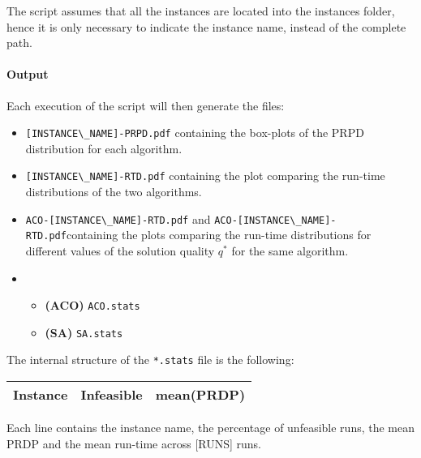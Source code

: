 \documentclass{article}
\begin{document}
The script assumes that all the instances are located into the instances folder, hence it is only necessary to indicate the instance name, instead of the complete path.

\paragraph{Output}

Each execution of the script will then generate the files:
\begin{itemize}
  \item \verb|[INSTANCE\_NAME]-PRPD.pdf| containing the box-plots of the PRPD distribution for each algorithm.
  \item \verb|[INSTANCE\_NAME]-RTD.pdf| containing the plot comparing the run-time distributions of the two algorithms.
  \item \verb|ACO-[INSTANCE\_NAME]-RTD.pdf| and \verb|ACO-[INSTANCE\_NAME]-RTD.pdf|containing the plots comparing the run-time distributions for different values of the solution quality $q^*$ for the same algorithm.
  \item 
        \begin{itemize}
          \item \textbf{(ACO)} \verb|ACO.stats| 
          \item \textbf{(SA)} \verb|SA.stats|
        \end{itemize}
\end{itemize}

The internal structure of the \verb|*.stats| file is the following:
\begin{center}
\begin{tabular}{|c|c|c|}
\hline
\textbf{Instance}	&	\textbf{Infeasible} & \textbf{mean(PRDP)} \\ \hline
\end{tabular}
\end{center}

Each line contains the instance name, the percentage of unfeasible runs, the mean PRDP and the mean run-time across [RUNS] runs.
\end{document}
